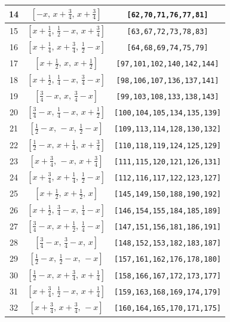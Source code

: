 \documentclass[fleqn,8pt]{jsarticle}
\begin{document}
\begin{longtable}{ccc}
14 & $\left[ - x,\, x + \frac{3}{4},\, x + \frac{3}{4} \right]$ & {\tt [62,70,71,76,77,81]} \\ \hline
15 & $\left[ x + \frac{1}{4},\, \frac{1}{2} - x,\, x + \frac{3}{4} \right]$ & {\tt [63,67,72,73,78,83]} \\ \hline
16 & $\left[ x + \frac{1}{4},\, x + \frac{3}{4},\, \frac{1}{2} - x \right]$ & {\tt [64,68,69,74,75,79]} \\ \hline
17 & $\left[ x + \frac{1}{2},\, x,\, x + \frac{1}{2} \right]$ & {\tt [97,101,102,140,142,144]} \\ \hline
18 & $\left[ x + \frac{1}{2},\, \frac{1}{4} - x,\, \frac{3}{4} - x \right]$ & {\tt [98,106,107,136,137,141]} \\ \hline
19 & $\left[ \frac{3}{4} - x,\, x,\, \frac{3}{4} - x \right]$ & {\tt [99,103,108,133,138,143]} \\ \hline
20 & $\left[ \frac{3}{4} - x,\, \frac{1}{4} - x,\, x + \frac{1}{2} \right]$ & {\tt [100,104,105,134,135,139]} \\ \hline
21 & $\left[ \frac{1}{2} - x,\, - x,\, \frac{1}{2} - x \right]$ & {\tt [109,113,114,128,130,132]} \\ \hline
22 & $\left[ \frac{1}{2} - x,\, x + \frac{1}{4},\, x + \frac{3}{4} \right]$ & {\tt [110,118,119,124,125,129]} \\ \hline
23 & $\left[ x + \frac{3}{4},\, - x,\, x + \frac{3}{4} \right]$ & {\tt [111,115,120,121,126,131]} \\ \hline
24 & $\left[ x + \frac{3}{4},\, x + \frac{1}{4},\, \frac{1}{2} - x \right]$ & {\tt [112,116,117,122,123,127]} \\ \hline
25 & $\left[ x + \frac{1}{2},\, x + \frac{1}{2},\, x \right]$ & {\tt [145,149,150,188,190,192]} \\ \hline
26 & $\left[ x + \frac{1}{2},\, \frac{3}{4} - x,\, \frac{1}{4} - x \right]$ & {\tt [146,154,155,184,185,189]} \\ \hline
27 & $\left[ \frac{3}{4} - x,\, x + \frac{1}{2},\, \frac{1}{4} - x \right]$ & {\tt [147,151,156,181,186,191]} \\ \hline
28 & $\left[ \frac{3}{4} - x,\, \frac{3}{4} - x,\, x \right]$ & {\tt [148,152,153,182,183,187]} \\ \hline
29 & $\left[ \frac{1}{2} - x,\, \frac{1}{2} - x,\, - x \right]$ & {\tt [157,161,162,176,178,180]} \\ \hline
30 & $\left[ \frac{1}{2} - x,\, x + \frac{3}{4},\, x + \frac{1}{4} \right]$ & {\tt [158,166,167,172,173,177]} \\ \hline
31 & $\left[ x + \frac{3}{4},\, \frac{1}{2} - x,\, x + \frac{1}{4} \right]$ & {\tt [159,163,168,169,174,179]} \\ \hline
32 & $\left[ x + \frac{3}{4},\, x + \frac{3}{4},\, - x \right]$ & {\tt [160,164,165,170,171,175]} \\
\end{longtable}
\end{document}
